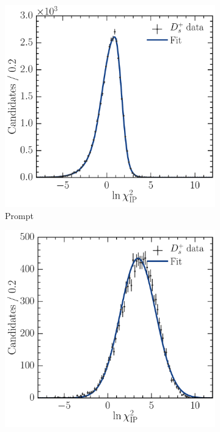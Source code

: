 \begin{figure}
  \begin{subfigure}[b]{0.5\textwidth}
    \centering
    \includegraphics[width=\textwidth]{figures/production/fitting/DsToKKpi_ipchisq_fit_pT_integrated_y_integrated_sig}
    \caption{Prompt}
    \label{fig:prod:fitting:prefits:DsToKKpi:prompt}
  \end{subfigure}
  \begin{subfigure}[b]{0.5\textwidth}
    \centering
    \includegraphics[width=\textwidth]{figures/production/fitting/DsToKKpi_ipchisq_fit_pT_integrated_y_integrated_sec}

\end{subfigure}
\end{figure}
